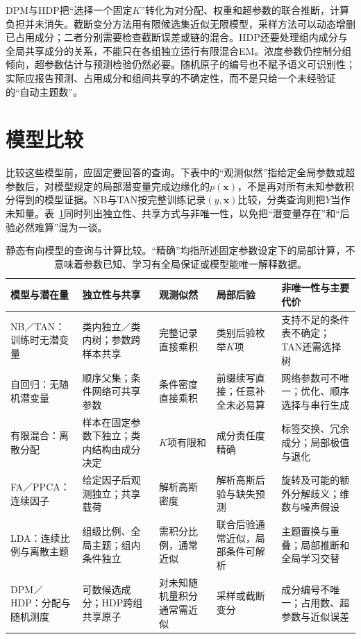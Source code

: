 DPM与HDP把“选择一个固定$K$”转化为对分配、权重和超参数的联合推断，计算负担并未消失。截断变分方法用有限候选集近似无限模型，采样方法可以动态增删已占用成分；二者分别需要检查截断误差或链的混合。HDP还要处理组内成分与全局共享成分的关系，不能只在各组独立运行有限混合EM。浓度参数仍控制分组倾向，超参数估计与预测检验仍然必要。随机原子的编号也不赋予语义可识别性；实际应报告预测、占用成分和组间共享的不确定性，而不是只给一个未经验证的“自动主题数”。

\section{模型比较}
\label{sec:pgm-static-directed-comparison}

比较这些模型前，应固定要回答的查询。下表中的“观测似然”指给定全局参数或超参数后，对模型规定的局部潜变量完成边缘化的$p(\bm{x})$，不是再对所有未知参数积分得到的模型证据。NB与TAN按完整训练记录$(y,\bm{x})$比较，分类查询则把$Y$当作未知量。表~\ref{tab:pgm-static-directed-comparison}同时列出独立性、共享方式与非唯一性，以免把“潜变量存在”和“后验必然难算”混为一谈。

\begin{table}[htbp]
  \centering
  \small
  \begin{tabularx}{\linewidth}{@{}
    >{\raggedright\arraybackslash}p{28mm}
    >{\raggedright\arraybackslash}p{30mm}
    >{\raggedright\arraybackslash}p{27mm}
    >{\raggedright\arraybackslash}p{30mm}
    >{\raggedright\arraybackslash}X@{}}
    \toprule
    模型与潜在量 & 独立性与共享 & 观测似然 & 局部后验 & 非唯一性与主要代价\\
    \midrule
    NB／TAN：训练时无潜变量 &
    类内独立／类内树；参数跨样本共享 &
    完整记录直接乘积 &
    类别后验枚举$K$项 &
    支持不足的条件表不确定；TAN还需选择树\\
    自回归：无随机潜变量 &
    顺序父集；条件网络可共享参数 &
    条件密度直接乘积 &
    前缀续写直接；任意补全未必易算 &
    网络参数可不唯一；优化、顺序选择与串行生成\\
    有限混合：离散分配 &
    样本在固定参数下独立；类内结构由成分决定 &
    $K$项有限和 &
    成分责任度精确 &
    标签交换、冗余成分；局部极值与退化\\
    FA／PPCA：连续因子 &
    给定因子后观测独立；共享载荷 &
    解析高斯密度 &
    解析高斯后验与缺失预测 &
    旋转及可能的额外分解歧义；维数与噪声假设\\
    LDA：连续比例与离散主题 &
    组级比例、全局主题；组内条件独立 &
    需积分比例，通常近似 &
    联合后验通常近似，局部条件可解析 &
    主题置换与重叠；局部推断和全局学习交替\\
    DPM／HDP：分配与随机测度 &
    可数候选成分；HDP跨组共享原子 &
    对未知随机量积分通常需近似 &
    采样或截断变分 &
    成分编号不唯一；占用数、超参数与近似误差\\
    \bottomrule
  \end{tabularx}
  \caption{静态有向模型的查询与计算比较。“精确”均指所述固定参数设定下的局部计算，不意味着参数已知、学习有全局保证或模型能唯一解释数据。}
  \label{tab:pgm-static-directed-comparison}
\end{table}


